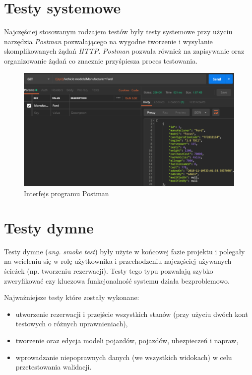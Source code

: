 \documentclass[eng,printmode,openany]{mgr}
\begin{document}
	\section{Testy systemowe}
	Najczęściej stosowanym rodzajem testów były testy systemowe przy użyciu narzędzia \textit{Postman} pozwalającego na wygodne tworzenie i wysyłanie skomplikowanych żądań \textit{HTTP}. \textit{Postman} pozwala również na zapisywanie oraz organizowanie żądań co znacznie przyśpiesza proces testowania.
	\begin{figure}[H]
		\centering
		\includegraphics[width=\textwidth]{images/tests_postman.png}
		\caption{Interfejs programu Postman}
	\end{figure}
	\section{Testy dymne}
	Testy dymne (\textit{ang. smoke test}) były użyte w końcowej fazie projektu i polegały na wcieleniu się w rolę użytkownika i przechodzeniu najczęściej używanych ścieżek (np. tworzeniu rezerwacji). Testy tego typu pozwalają szybko zweryfikować czy kluczowa funkcjonalność systemu działa bezproblemowo.
	
	Najważniejsze testy które zostały wykonane:
	\begin{itemize}
		\item utworzenie rezerwacji i przejście wszystkich stanów (przy użyciu dwóch kont testowych o różnych uprawnieniach),
		\item tworzenie oraz edycja modeli pojazdów, pojazdów, ubezpieczeń i napraw,
		\item wprowadzanie niepoprawnych danych (we wszystkich widokach) w celu przetestowania walidacji.
	\end{itemize}
	
	\newpage
\end{document}
